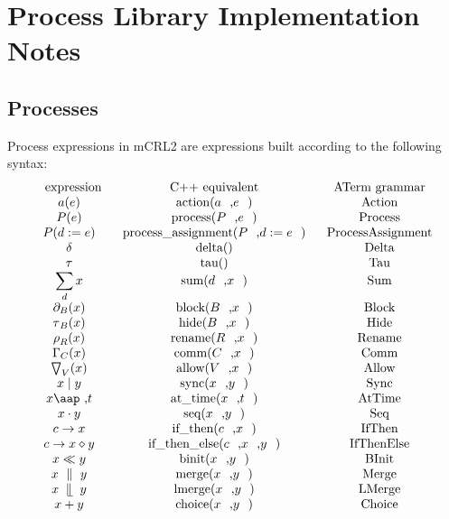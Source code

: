 \documentclass{article}
\begin{document}
\section{Process Library Implementation Notes}

\subsection{Processes}

Process expressions in mCRL2 are expressions built according to the
following syntax:%
\[
\begin{array}{ccc}
\text{expression} & \text{C++ equivalent} & \text{ATerm grammar} \\ 
a(e) & \text{action(}a\text{,}e\text{)} & \text{Action} \\ 
P(e) & \text{process(}P\text{,}e\text{)} & \text{Process} \\ 
P(d:=e) & \text{process\_assignment(}P\text{,}d:=e\text{)} & \text{%
ProcessAssignment} \\ 
\delta  & \text{delta()} & \text{Delta} \\ 
\tau  & \text{tau()} & \text{Tau} \\ 
\dsum\limits_{d}x & \text{sum(}d\text{,}x\text{)} & \text{Sum} \\ 
\partial _{B}(x) & \text{block(}B\text{,}x\text{)} & \text{Block} \\ 
\tau _{B}(x) & \text{hide(}B\text{,}x\text{)} & \text{Hide} \\ 
\rho _{R}(x) & \text{rename(}R\text{,}x\text{)} & \text{Rename} \\ 
\Gamma _{C}(x) & \text{comm(}C\text{,}x\text{)} & \text{Comm} \\ 
\bigtriangledown _{V}(x) & \text{allow(}V\text{,}x\text{)} & \text{Allow} \\ 
x\mid y & \text{sync(}x\text{,}y\text{)} & \text{Sync} \\ 
x\mbox{\aap ,}t & \text{at\_time(}x\text{,}t\text{)} & \text{AtTime} \\ 
x\cdot y & \text{seq(}x\text{,}y\text{)} & \text{Seq} \\ 
c\rightarrow x & \text{if\_then(}c\text{,}x\text{)} & \text{IfThen} \\ 
c\rightarrow x\diamond y & \text{if\_then\_else(}c\text{,}x\text{,}y\text{)}
& \text{IfThenElse} \\ 
x\ll y & \text{binit(}x\text{,}y\text{)} & \text{BInit} \\ 
x\ \parallel \ y & \text{merge(}x\text{,}y\text{)} & \text{Merge} \\ 
x\ \mathbin{\mathrel{\llfloor}}\ y & \text{lmerge(}x\text{,}y\text{)} & 
\text{LMerge} \\ 
x+y & \text{choice(}x\text{,}y\text{)} & \text{Choice}%
\end{array}%
\]
\end{document}

